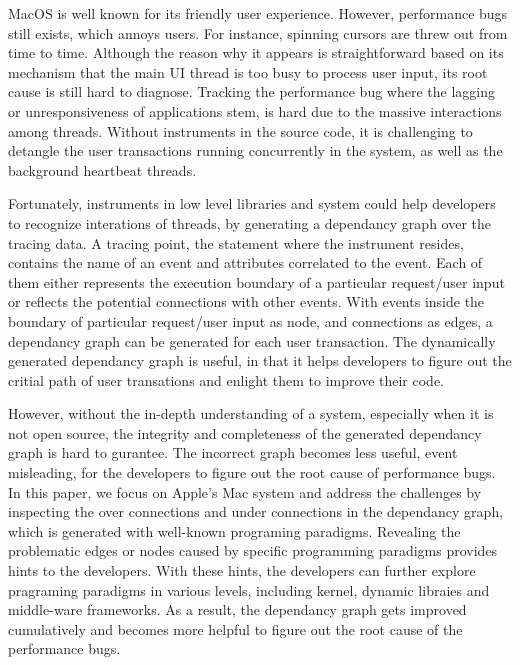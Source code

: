 MacOS is well known for its friendly user experience.
However, performance bugs still exists, which annoys users.
For instance, spinning cursors are threw out from time to time.
Although the reason why it appears is straightforward based on its mechanism that the main UI thread is too busy to process user input, its root cause is still hard to diagnose.
Tracking the performance bug where the lagging or unresponsiveness of applications stem, is hard due to the massive interactions among threads.
Without instruments in the source code, it is challenging to detangle the user transactions running concurrently in the system, as well as the background heartbeat threads.
\par
Fortunately, instruments in low level libraries and system could help developers to recognize interations of threads,
by generating a dependancy graph over the tracing data.
A tracing point, the statement where the instrument resides, contains the name of an event and attributes correlated to the event. 
Each of them either represents the execution boundary of a particular request/user input or reflects the potential connections with other events. 
With events inside the boundary of particular request/user input as node, and connections as edges, a dependancy graph can be generated for each user transaction.
The dynamically generated dependancy graph is useful, in that it helps developers to figure out the critial path of user transations and enlight them to improve their code.
\par
However, without the in-depth understanding of a system, especially when it is not open source, the integrity and completeness of the generated dependancy graph is hard to gurantee.
The incorrect graph becomes less useful, event misleading, for the developers to figure out the root cause of performance bugs.
In this paper, we focus on Apple's Mac system and address the challenges by inspecting the over connections and under connections in the dependancy graph, which is generated with well-known programing paradigms.
Revealing the problematic edges or nodes caused by specific programming paradigms provides hints to the developers.
With these hints, the developers can further explore pragraming paradigms in various levels, including kernel, dynamic libraies and middle-ware frameworks.
As a result, the dependancy graph gets improved cumulatively and becomes more helpful to figure out the root cause of the performance bugs.

